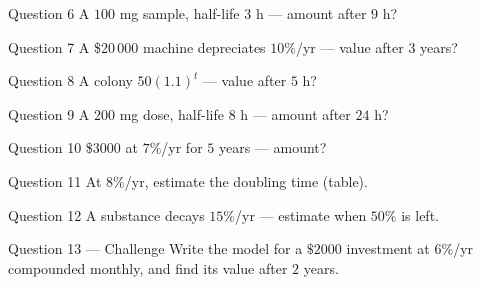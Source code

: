 \documentclass[11pt]{article}
\begin{document}
\begin{qbox}{Question 6}
A $100$ mg sample, half-life $3$ h — amount after $9$ h?\workspace{2.4cm}
\end{qbox}

\begin{qbox}{Question 7}
A \$20\,000 machine depreciates $10\%$/yr — value after $3$ years?\workspace{2.4cm}
\end{qbox}

\begin{qbox}{Question 8}
A colony $50(1.1)^{t}$ — value after $5$ h?\workspace{2.4cm}
\end{qbox}

\begin{qbox}{Question 9}
A $200$ mg dose, half-life $8$ h — amount after $24$ h?\workspace{2.4cm}
\end{qbox}

\begin{qbox}{Question 10}
\$3000 at $7\%$/yr for $5$ years — amount?\workspace{2.4cm}
\end{qbox}

\begin{qbox}{Question 11}
At $8\%$/yr, estimate the doubling time (table).\workspace{2.4cm}
\end{qbox}

\begin{qbox}{Question 12}
A substance decays $15\%$/yr — estimate when $50\%$ is left.\workspace{2.4cm}
\end{qbox}

\begin{qbox}{Question 13 --- Challenge}
Write the model for a $\$2000$ investment at $6\%$/yr compounded monthly, and find its value after $2$ years.\workspace{3.2cm}
\end{qbox}

\clearpage
{}
\end{document}
